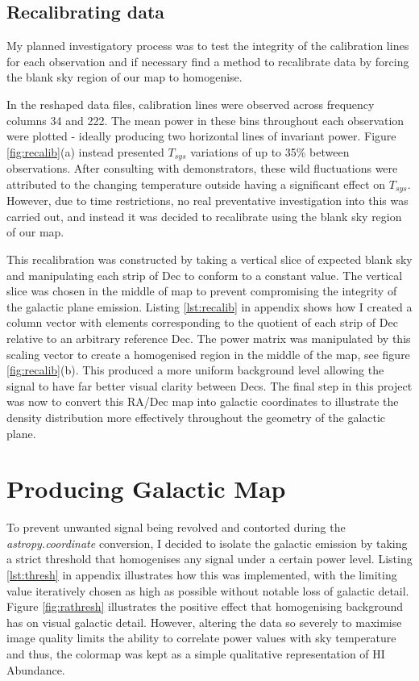 \documentclass[a4paper]{jpconf}
\begin{document}
\begin{multicols}{2}
 \subsection{Recalibrating data} \label{recalib}

My planned investigatory process was to test the integrity of the calibration lines for each observation and if necessary find a method to recalibrate data by forcing the blank sky region of our map to homogenise.




In the reshaped data files, calibration lines were observed across frequency columns 34 and 222. The mean power in these bins throughout each observation were plotted - ideally producing two horizontal lines of invariant power. Figure \ref{fig:recalib}(a) instead presented $T_{sys}$ variations of up to 35\% between observations. After consulting with demonstrators, these wild fluctuations were attributed to the changing temperature outside having a significant effect on $T_{sys}$. However, due to time restrictions, no real preventative investigation into this was carried out, and instead it was decided to recalibrate using the blank sky region of our map.

This recalibration was constructed by taking a vertical slice of expected blank sky and manipulating each strip of Dec to conform to a constant value. The vertical slice was chosen in the middle of map to prevent compromising the integrity of the galactic plane emission. Listing \ref{lst:recalib} in appendix shows how I created a column vector with elements corresponding to the quotient of each strip of Dec relative to an arbitrary reference Dec. The power matrix was manipulated by this scaling vector to create a homogenised region in the middle of the map, see figure \ref{fig:recalib}(b). This produced a more uniform background level allowing the signal to have far better visual clarity between Decs. The final step in this project was now to convert this RA/Dec map into galactic coordinates to illustrate the density distribution more effectively throughout the geometry of the galactic plane.

\section{Producing Galactic Map} \label{gal map}

To prevent unwanted signal being revolved and contorted during the \textit{astropy.coordinate} conversion, I decided to isolate the galactic emission by taking a strict threshold that homogenises any signal under a certain power level. Listing \ref{lst:thresh} in appendix illustrates how this was implemented, with the limiting value iteratively chosen as high as possible without notable loss of galactic detail. Figure \ref{fig:rathresh} illustrates the positive effect that homogenising background has on visual galactic detail. However, altering the data so severely to maximise image quality limits the ability to correlate power values with sky temperature and thus, the colormap was kept as a simple qualitative representation of HI Abundance.




\end{multicols}
\end{document}

